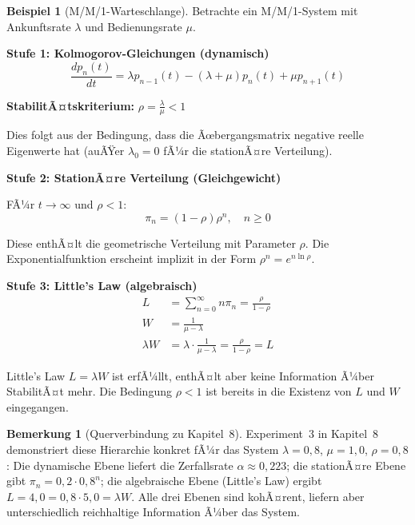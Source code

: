 ﻿\documentclass[a4paper,12pt]{scrreprt}
\theoremstyle{definition}
\newtheorem{bemerkung}{Bemerkung}[section]
\newtheorem{beispiel}{Beispiel}[section]
\begin{document}
\begin{beispiel}[M/M/1-Warteschlange]
	Betrachte ein M/M/1-System mit Ankunftsrate $\lambda$ und Bedienungsrate $\mu$.
	
	\textbf{Stufe 1: Kolmogorov-Gleichungen (dynamisch)}
	\begin{equation}
		\frac{dp_n(t)}{dt} = \lambda p_{n-1}(t) - (\lambda + \mu) p_n(t) + \mu p_{n+1}(t)
	\end{equation}
	
	\textbf{StabilitÃ¤tskriterium:} $\rho = \frac{\lambda}{\mu} < 1$
	
	Dies folgt aus der Bedingung, dass die Ãœbergangsmatrix negative reelle Eigenwerte hat (auÃŸer $\lambda_0 = 0$ fÃ¼r die stationÃ¤re Verteilung).
	
	\textbf{Stufe 2: StationÃ¤re Verteilung (Gleichgewicht)}
	
	FÃ¼r $t \to \infty$ und $\rho < 1$:
	\begin{equation}
		\pi_n = (1-\rho) \rho^n, \quad n \geq 0
	\end{equation}
	
	Diese enthÃ¤lt die geometrische Verteilung mit Parameter $\rho$. Die Exponentialfunktion erscheint implizit in der Form $\rho^n = e^{n \ln \rho}$.
	
	\textbf{Stufe 3: Little's Law (algebraisch)}
	\begin{align}
		L &= \sum_{n=0}^{\infty} n \pi_n = \frac{\rho}{1-\rho} \\
		W &= \frac{1}{\mu - \lambda} \\
		\lambda W &= \lambda \cdot \frac{1}{\mu - \lambda} = \frac{\rho}{1-\rho} = L
	\end{align}
	
	Little's Law $L = \lambda W$ ist erfÃ¼llt, enthÃ¤lt aber keine Information
	Ã¼ber StabilitÃ¤t mehr.  Die Bedingung $\rho < 1$ ist bereits in die Existenz
	von $L$ und $W$ eingegangen.
	
	\begin{bemerkung}[Querverbindung zu Kapitel~8]
		Experiment~3 in Kapitel~8 demonstriert diese Hierarchie konkret fÃ¼r das
		System $\lambda = 0{,}8$, $\mu = 1{,}0$, $\rho = 0{,}8$: Die
		dynamische Ebene liefert die Zerfallsrate $\alpha \approx 0{,}223$;
		die stationÃ¤re Ebene gibt $\pi_n = 0{,}2 \cdot 0{,}8^n$; die
		algebraische Ebene (Little's Law) ergibt $L = 4{,}0 = 0{,}8 \cdot 5{,}0 = \lambda W$.
		Alle drei Ebenen sind kohÃ¤rent, liefern aber unterschiedlich reichhaltige
		Information Ã¼ber das System.
	\end{bemerkung}
\end{beispiel}
\end{document}

